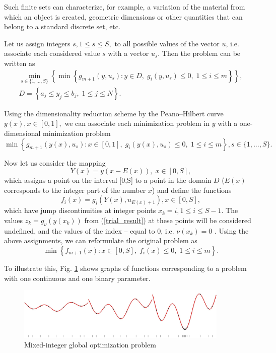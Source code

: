 \documentclass[
11pt,%
tightenlines,%
twoside,%
onecolumn,%
nofloats,%
nobibnotes,%
nofootinbib,%
superscriptaddress,%
noshowpacs,%
centertags]%
{revtex4}
\begin{document}
Such finite sets can characterize, for example, a variation of the material from which an object is created, geometric dimensions or other quantities that can belong to a standard discrete set, etc.


Let us assign integers  $s, 1\leq s \leq S,$ to all possible values of the vector $u$, i.e. associate each considered value $s$ with a vector $u_s$.
Then the problem can be written as
\begin{gather}\label{problem_is}
 \min_{s\in\{1,...,S\}}\left\{\min{\left\{ g_{m+1}(y,u_s):y\in D, \; g_i(y,u_s)\leq 0, \; 1 \leq i \leq m\right\}}\right\},\\
 D=\left\{ a_j\leq y_j \leq b_j, \; 1 \leq j\leq N \right\}.\nonumber
\end{gather}

Using the dimensionality reduction scheme by the Peano--Hilbert
curve $y(x), x\in [0,1],$ we can associate each minimization problem
in $y$ with a one-dimensional minimization problem
\[
 \min{\left\{ g_{m+1}(y(x),u_s):x \in [0,1], \; g_i(y(x),u_s)\leq 0, \; 1 \leq i \leq m\right\}}, s\in\{1,...,S\}.
\]

Now let us consider the mapping
\[
Y(x)=y(x-E(x)), \; x\in[0,S],
\]
which assigns a point on the interval  [0,S] to a point in the domain $D$ ($E(x)$ corresponds to the integer part of the number $x$) and define the functions
\[
f_i(x) = g_i(Y(x),u_{E(x)+1}), x\in[0,S],
\]
which have jump discontinuities at integer points $x_k = i, 1\leq i
\leq S-1$. The values $z_k = g_\nu(y(x_k))$ from
(\ref{trial_result}) at these points will be considered undefined,
and the values of the index -- equal to 0, i.e. $\nu(x_k) = 0$ .
Using the above assignments, we can reformulate the original problem
as
\begin{equation}\label{problem_is1}
\min \left\{f_{m+1}(x): x \in [0,S], \; f_i(x) \leq 0, \; 1 \leq i \leq m\right\}.
\end{equation}

To illustrate this, Fig. \ref{fig:1} shows graphs of functions corresponding to a problem with one continuous and one binary parameter.
\begin{figure}[ht]
    \centering
    \includegraphics[width=0.9\textwidth]{fig1.jpg}
    \caption{Mixed-integer global optimization problem}
    \label{fig:1}
\end{figure}
\end{document}
